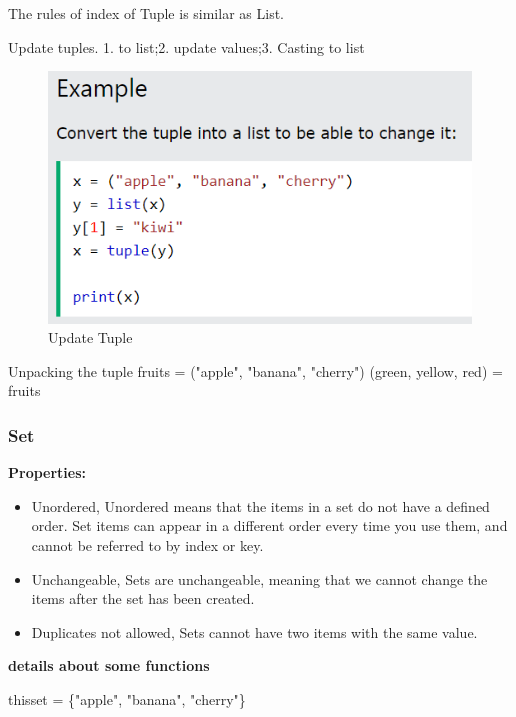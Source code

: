 \documentclass[UTF8]{article}
\begin{document}
The rules of index of Tuple is similar as List.

Update tuples. 1. to list;2. update values;3. Casting to list

\begin{figure}[!h]
    \centering
    \includegraphics[scale=0.5]{Images/tupleupdate.PNG}
    \caption{Update Tuple}
\end{figure}

Unpacking the tuple \newline
fruits = ("apple", "banana", "cherry") \newline
(green, yellow, red) = fruits


\subsubsection{Set}
\textbf{Properties:}
\begin{itemize}
    \item Unordered, Unordered means that the items in a set do not have a defined order. Set items can appear in a different order every time you use them, and cannot be referred to by index or key.
    \item Unchangeable, Sets are unchangeable, meaning that we cannot change the items after the set has been created.
    \item Duplicates not allowed, Sets cannot have two items with the same value.
\end{itemize}


\textbf{details about some functions}

thisset = \{"apple", "banana", "cherry"\}
\end{document}
